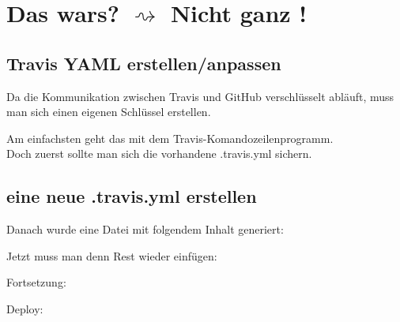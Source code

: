 \newpage
\section{Das wars? $\rightsquigarrow$  Nicht ganz !}
\subsection{Travis YAML erstellen/anpassen}
Da die Kommunikation zwischen Travis und GitHub verschlüsselt abläuft, muss man sich einen eigenen Schlüssel erstellen.

Am einfachsten geht das mit dem Travis-Komandozeilenprogramm.\\
Doch zuerst sollte man sich die vorhandene .travis.yml sichern.
\vspace{0.3cm}
\subsection{eine neue .travis.yml erstellen}

\newpage
Danach wurde eine Datei mit folgendem Inhalt generiert:

\newpage
Jetzt muss man denn Rest wieder einfügen:


\newpage
Fortsetzung:


\newpage
Deploy:



\newpage %


